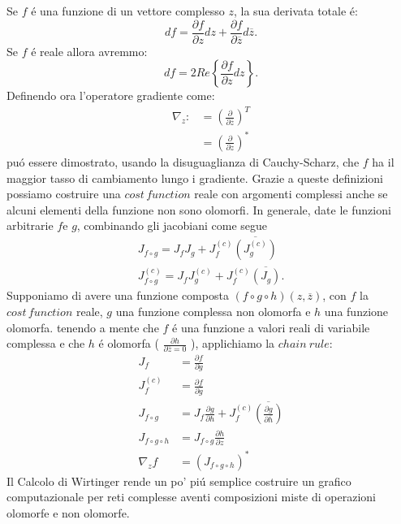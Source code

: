 \documentclass[a4paper,10pt]{article}
\begin{document}
 Se $f$ \'e una funzione di un vettore complesso $z$, la sua derivata totale \'e:
 \begin{equation}
  df=\frac{\partial f}{\partial z}dz+\frac{\partial f}{\partial \overline{z}}d\overline{z}.
 \end{equation}
 Se $f$ \'e reale allora avremmo:
 \begin{equation}
  df=2Re\left \{ \frac{\partial f}{\partial z} dz \right \}.
 \end{equation}
 Definendo ora l'operatore gradiente come:
 \begin{align}
  \nabla_z :&= \left(\frac{\partial}{\partial\overline{z}}\right)^T\\
  &=\left(\frac{\partial}{\partial z}\right)^*
 \end{align}
 pu\'o essere dimostrato, usando la disuguaglianza di Cauchy-Scharz, che $f$ ha il maggior tasso di cambiamento lungo i gradiente. Grazie a queste definizioni possiamo costruire una $cost \, function$ reale con argomenti complessi anche se alcuni elementi della funzione non sono olomorfi. In generale, date le funzioni arbitrarie $f$e $g$, combinando gli jacobiani come segue
 \begin{align}
  J_{f\circ g} = J_f J_g + J_f^{\left(c\right)}\overline{\left(J_g^{\left(c\right)}\right)}\\
  J_{f\circ g}^{\left(c\right)} = J_f J_g^{\left(c\right)} + J_f^{\left(c\right)}\overline{\left(J_g\right)}.
 \end{align}
 Supponiamo di avere una funzione composta $\left(f\circ g\circ h\right)\left(z,\overline{z}\right)$, con $f$ la $cost \, function$ reale, $g$ una funzione complessa non olomorfa e $h$ una funzione olomorfa. tenendo a mente che $f$ \'e una funzione a valori reali di variabile complessa e che $h$ \'e olomorfa ( $\frac{\partial h}{\partial \overline{z} = 0}$ ), applichiamo la $chain \ rule$:
 \begin{align}
  J_f &= \frac{ \partial f}{ \partial g}\\
  J_f^{\left( c\right)} &= \frac{\partial f}{\partial \overline{g}}\\
  J_{f\circ g} &= J_f \frac{\partial g}{\partial h} + J_f^{\left( c\right)} \overline{\left( \frac{\partial g}{\partial \overline{h}}\right) }\\
  J_{f\circ g\circ h} &= J_{f\circ g} \frac{\partial h}{\partial z}\\
  \nabla_z f &= \left( J_{f\circ g\circ h}\right)^*
 \end{align}
 Il Calcolo di Wirtinger rende un po' pi\'u semplice costruire un grafico computazionale per reti complesse aventi composizioni miste di operazioni olomorfe e non olomorfe.
 
\end{document}
